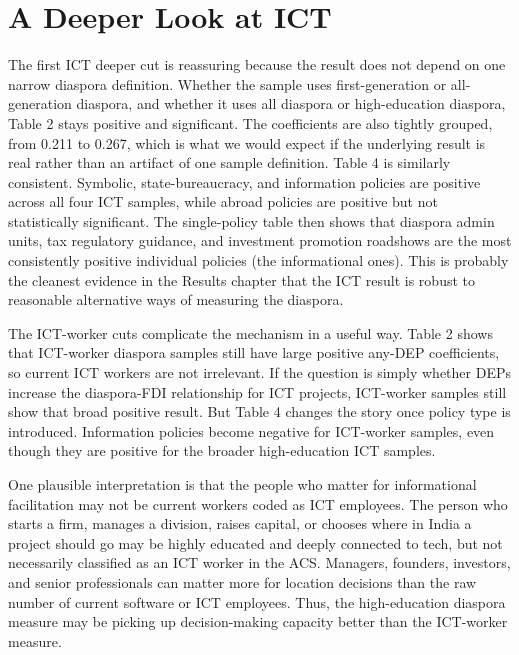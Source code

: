 \documentclass[doublespace,nopageskip]{UVAthesis}
\begin{document}
\FloatBarrier
\section{A Deeper Look at ICT} \label{ss:ict}





The first ICT deeper cut is reassuring because the result does not depend on one narrow diaspora definition. Whether the sample uses first-generation or all-generation diaspora, and whether it uses all diaspora or high-education diaspora, Table 2 stays positive and significant. The coefficients are also tightly grouped, from 0.211 to 0.267, which is what we would expect if the underlying result is real rather than an artifact of one sample definition. Table 4 is similarly consistent. Symbolic, state-bureaucracy, and information policies are positive across all four ICT samples, while abroad policies are positive but not statistically significant. The single-policy table then shows that diaspora admin units, tax regulatory guidance, and investment promotion roadshows are the most consistently positive individual policies (the informational ones). This is probably the cleanest evidence in the Results chapter that the ICT result is robust to reasonable alternative ways of measuring the diaspora.





The ICT-worker cuts complicate the mechanism in a useful way. Table 2 shows that ICT-worker diaspora samples still have large positive any-DEP coefficients, so current ICT workers are not irrelevant. If the question is simply whether DEPs increase the diaspora-FDI relationship for ICT projects, ICT-worker samples still show that broad positive result. But Table 4 changes the story once policy type is introduced. Information policies become negative for ICT-worker samples, even though they are positive for the broader high-education ICT samples. 

One plausible interpretation is that the people who matter for informational facilitation may not be current workers coded as ICT employees. The person who starts a firm, manages a division, raises capital, or chooses where in India a project should go may be highly educated and deeply connected to tech, but not necessarily classified as an ICT worker in the ACS. Managers, founders, investors, and senior professionals can matter more for location decisions than the raw number of current software or ICT employees. Thus, the high-education diaspora measure may be picking up decision-making capacity better than the ICT-worker measure.
\end{document}
